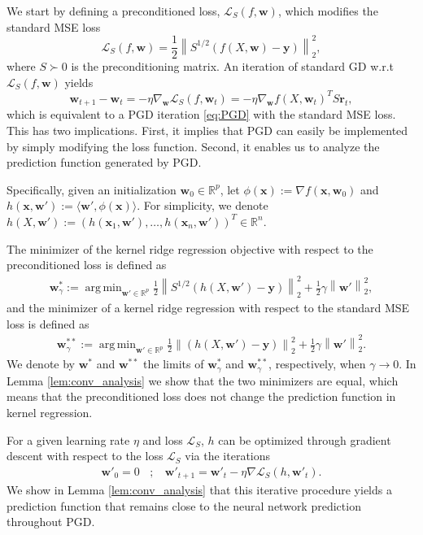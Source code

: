 \documentclass[10pt]{article} %
\theoremstyle{plain}
\theoremstyle{definition}
\theoremstyle{remark}
\newcommand{\Real}{\mathbb{R}}
\newcommand{\norm}[1]{\left\lVert#1\right\rVert}
\newcommand{\x}{\mathbf{x}}
\newcommand{\y}{\mathbf{y}}
\newcommand{\res}{\mathbf{r}}
\newcommand{\w}{\mathbf{w}}
\newcommand{\calL}{\mathcal{L}}
\DeclareMathOperator*{\argmin}{arg\,min}
\begin{document}
We start by defining a preconditioned loss, $\calL_S(f,\w)$, which modifies the standard MSE loss
\begin{equation}\label{eq:modified_loss}
\mathcal{L}_S(f, \w)=\frac{1}{2} \norm{S^{1/2}(f(X,\w)-\y)}^2_2,
\end{equation}
where $S \succ 0$ is the preconditioning matrix. An iteration of standard GD w.r.t $\calL_S(f,\w)$ yields 
\begin{equation}
    \w_{t+1}- \w_{t} = -\eta\nabla_{\w} \mathcal{L}_S(f, \w_t) = -\eta \nabla_{\w} f(X,\w_t)^T S \res_t,
\end{equation}
which is equivalent to a PGD iteration \eqref{eq:PGD} with the standard MSE loss. This has two implications. First, it implies that PGD can easily be implemented by simply modifying the loss function. Second, it enables us to analyze the prediction function generated by PGD.

Specifically, given an initialization $\w_0\in\Real^p$, let $\phi(\x):=\nabla f(\x,\w_0)$ and $h(\x,\w'):=\langle \w'
, \phi(\x)\rangle$. For simplicity, we denote $h(X,\w'
):=(h(\x_1,\w'
),\ldots,h(\x_n,\w'
))^T\in\Real^n$.

The minimizer of the kernel ridge regression objective  with respect to the preconditioned loss is defined as 
\begin{align} \label{eq:w_pgd}
\w^{*}_{\gamma}:=\argmin_{\w'\in\Real^p} \frac{1}{2}\norm{S^{1/2}(h(X,\w'
)-\y)}_2^2 + \frac{1}{2}\gamma \norm{\w'
}_2^2,
\end{align}
and the minimizer of a kernel ridge regression with respect to the standard MSE loss is defined as 
\begin{align}\label{eq:w_gd}
\w^{**}_{\gamma}:=\argmin_{\w'\in\Real^p} \frac{1}{2}\norm{(h(X,\w'
)-\y)}_2^2 + \frac{1}{2}\gamma \norm{\w'
}_2^2.
\end{align}
We denote by $\w^*$ and $\w^{**}$ the limits of $\w^{*}_{\gamma}$ and $\w^{**}_{\gamma}$, respectively, when $\gamma\to 0$. In Lemma \ref{lem:conv_analysis} we show that the two minimizers are equal, which means that the preconditioned loss does not change the prediction function in kernel regression.

For a given learning rate $\eta$ and loss $\mathcal{L}_S$, $h$ can be optimized through gradient descent with respect to the loss $\mathcal{L}_S$ via the iterations
\begin{align}\label{eq:pgd_h}
    \w'_0=0 ~~~~;~~~~ \w'_{t+1} =\w'_{t}-\eta\nabla\mathcal{L}_S(h,\w'_t).
\end{align}
We show in Lemma \ref{lem:conv_analysis} that this iterative procedure yields a prediction function that remains close to the neural network prediction throughout PGD.
\end{document}
